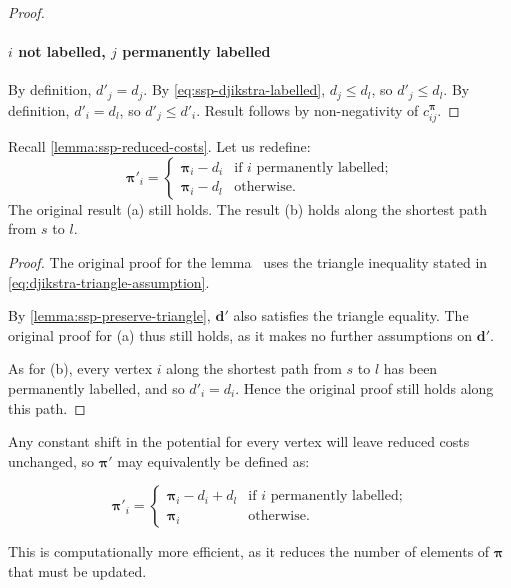 \begin{proof}
    \paragraph{$i$ not labelled, $j$ permanently labelled} By definition, $d'_j = d_j$. By \cref{eq:ssp-djikstra-labelled}, $d_j \leq d_l$, so $d'_j \leq d_l$. By definition, $d'_i = d_l$, so $d'_j \leq d'_i$. Result follows by non-negativity of $c^{\boldsymbol{\pi}}_{ij}$.
\end{proof}

\begin{lemma}
    Recall \cref{lemma:ssp-reduced-costs}. Let us redefine:
    {\normalfont
        \[\boldsymbol{\pi}'_{i}=\begin{cases}
        \boldsymbol{\pi}_{i}-d_{i} & \textrm{if $i$ permanently labelled;}\\
        \boldsymbol{\pi}_{i}-d_{l} & \textrm{otherwise.}
        \end{cases}\]}\noindent
    The original result (a) still holds. The result (b) holds along the shortest path from $s$ to $l$\footnotemark.
\end{lemma}
\begin{proof}
    The original proof for the lemma~\cite[lemma~9.11]{Ahuja:1993} uses the triangle inequality stated in \cref{eq:djikstra-triangle-assumption}. 
    
    By \cref{lemma:ssp-preserve-triangle}, $\mathbf{d}'$ also satisfies the triangle equality. The original proof for (a) thus still holds, as it makes no further assumptions on $\mathbf{d}'$.
    
    As for (b), every vertex $i$ along the shortest path from $s$ to $l$ has been permanently labelled, and so $d'_i = d_i$. Hence the original proof still holds along this path.
\end{proof}

Any constant shift in the potential for every vertex will leave reduced costs unchanged, so $\boldsymbol{\pi}'$ may equivalently be defined as:

\[\boldsymbol{\pi}'_{i}=\begin{cases}
\boldsymbol{\pi}_{i}-d_i+d_l & \text{if $i$ permanently labelled;}\\
\boldsymbol{\pi}_{i} & \text{otherwise.}
\end{cases}\]

This is computationally more efficient, as it reduces the number of elements of $\boldsymbol{\pi}$ that must be updated.

